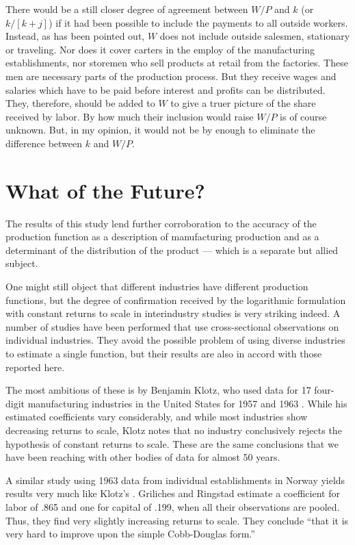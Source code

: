 \documentclass{article}
\begin{document}
There would be a still closer degree of agreement between \(W/P\) and \(k\) (or \(k/[k + j]\)) if it had been possible to include the payments to all outside workers. Instead, as has been pointed out, \(W\) does not include outside salesmen, stationary or traveling. Nor does it cover carters in the employ of the manufacturing establishments, nor storemen who sell products at retail from the factories. These men are necessary parts of the production process. But they receive wages and salaries which have to be paid before interest and profits can be distributed. They, therefore, should be added to \(W\) to give a truer picture of the share received by labor. By how much their inclusion would raise \(W/P\) is of course unknown. But, in my opinion, it would not be by enough to eliminate the difference between \(k\) and \(W/P\).

\section*{What of the Future?}

The results of this study lend further corroboration to the accuracy of the production function as a description of manufacturing production and as a determinant of the distribution of the product --- which is a separate but allied subject.

One might still object that different industries have different production functions, but the degree of confirmation received by the logarithmic formulation with constant returns to scale in interindustry studies is very striking indeed. A number of studies have been performed that use cross-sectional observations on individual industries. They avoid the possible problem of using diverse industries to estimate a single function, but their results are also in accord with those reported here. 
 

The most ambitious of these is by Benjamin Klotz, who used data for 17 four-digit manufacturing industries in the United States for 1957 and 1963 \cite{Klotz:1}. While his estimated coefficients vary considerably, and while most industries show decreasing returns to scale, Klotz notes that no industry conclusively rejects the hypothesis of constant returns to scale. These are the same conclusions that we have been reaching with other bodies of data for almost 50 years.

A similar study using 1963 data from individual establishments in Norway yields results very much like Klotz's \cite{Griliches:1}. Griliches and Ringstad estimate a coefficient for labor of .865 and one for capital of .199, when all their observations are pooled. Thus, they find very slightly increasing returns to scale. They conclude ``that it is very hard to improve upon the simple Cobb-Douglas form.''
\end{document}
